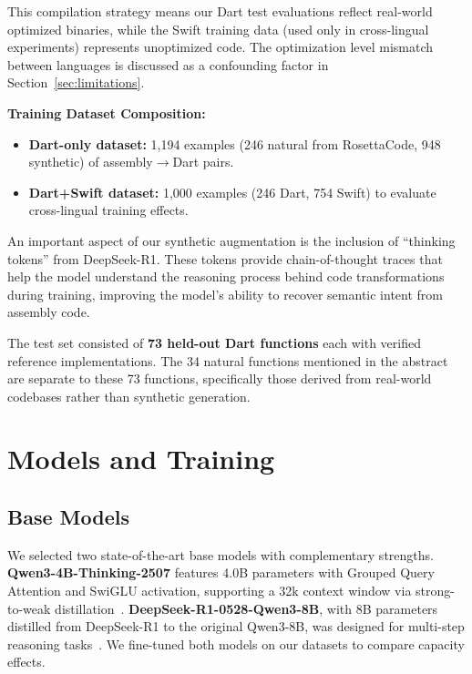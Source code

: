 \documentclass[10pt,conference]{IEEEtran}
\begin{document}
This compilation strategy means our Dart test evaluations reflect real-world optimized binaries, while the Swift training data (used only in cross-lingual experiments) represents unoptimized code. The optimization level mismatch between languages is discussed as a confounding factor in Section~\ref{sec:limitations}.

\textbf{Training Dataset Composition:}
\begin{itemize}[leftmargin=*]
\item \textbf{Dart-only dataset:} 1{,}194 examples (246 natural from RosettaCode, 948 synthetic) of assembly$\rightarrow$Dart pairs.
\item \textbf{Dart+Swift dataset:} 1{,}000 examples (246 Dart, 754 Swift) to evaluate cross-lingual training effects.
\end{itemize}

An important aspect of our synthetic augmentation is the inclusion of ``thinking tokens'' from DeepSeek-R1. These tokens provide chain-of-thought traces that help the model understand the reasoning process behind code transformations during training, improving the model's ability to recover semantic intent from assembly code.

The test set consisted of \textbf{73 held-out Dart functions} each with verified reference implementations. The 34 natural functions mentioned in the abstract are separate to these 73 functions, specifically those derived from real-world codebases rather than synthetic generation.

\section{Models and Training}

\subsection{Base Models}
We selected two state-of-the-art base models with complementary strengths. \textbf{Qwen3-4B-Thinking-2507} features 4.0B parameters with Grouped Query Attention and SwiGLU activation, supporting a 32k context window via strong-to-weak distillation~\cite{qwen3}. \textbf{DeepSeek-R1-0528-Qwen3-8B}, with 8B parameters distilled from DeepSeek-R1 to the original Qwen3-8B, was designed for multi-step reasoning tasks~\cite{deepseekr1}. We fine-tuned both models on our datasets to compare capacity effects.
\end{document}
